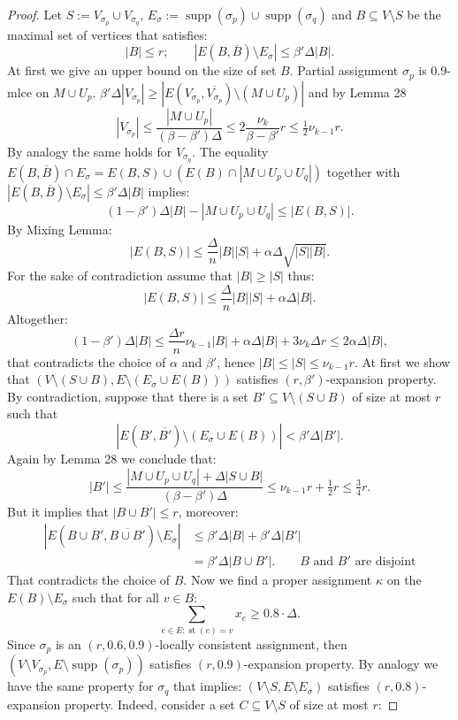 \documentclass[10pt,a4paper]{article}
\newcommand{\supp}{\operatorname{supp}}
\newcommand{\st}{\operatorname{st}}
\begin{document}
\begin{proof}
Let $S:=V_{\sigma_p}\cup V_{\sigma_q}$, $E_\sigma:=\supp(\sigma_p)\cup\supp(\sigma_q)$ and $B\subseteq V\setminus S$ be the maximal set of vertices that satisfies:
\[|B|\le r;\qquad |E(B,\overline B)\setminus E_\sigma|\le\beta'\Delta|B|.\]
At first we give an upper bound on the size of set $B$.
Partial assignment $\sigma_p$ is $0.9$-mlce on $M\cup U_p$. $\beta'\Delta|V_{\sigma_p}|\ge|E(V_{\sigma_p},\overline{V_{\sigma_p}})\setminus(M\cup U_p)|$ and by Lemma 28
\[|V_{\sigma_p}|\le\frac{|M\cup U_p|}{(\beta-\beta')\Delta}\le2\frac{\nu_k}{\beta-\beta'}r\le\tfrac12\nu_{k-1}r.\]
By analogy the same holds for $V_{\sigma_q}$.
The equality $E(B,\overline B)\cap E_\sigma=E(B,S)\cup(E(B)\cap|M\cup U_p\cup U_q|)$ together with $|E(B,\overline B)\setminus E_\sigma|\le\beta'\Delta|B|$ implies:
\[(1-\beta')\Delta|B|-|M\cup U_p\cup U_q|\le|E(B,S)|.\]
By Mixing Lemma:
\[|E(B,S)|\le\frac\Delta n|B||S|+\alpha\Delta\sqrt{|S||B|}.\]
For the sake of contradiction assume that $|B|\ge|S|$ thus:
\[|E(B,S)|\le\frac\Delta n|B||S|+\alpha\Delta|B|.\]
Altogether:
\[(1-\beta')\Delta|B|\le\frac{\Delta r}{n}\nu_{k-1}|B|+\alpha\Delta|B|+3\nu_k\Delta r\le2\alpha\Delta|B|,\]
that contradicts the choice of $\alpha$ and $\beta'$, hence $|B|\le|S|\le\nu_{k-1}r$.
At first we show that $(V\setminus(S\cup B),E\setminus(E_\sigma\cup E(B)))$ satisfies $(r,\beta')$-expansion property. By contradiction, suppose that there is a set $B'\subseteq V\setminus(S\cup B)$ of size at most $r$ such that
\[|E(B',\overline{B'})\setminus(E_\sigma\cup E(B))|<\beta'\Delta|B'|.\]
Again by Lemma 28 we conclude that:
\[|B'|\le\frac{|M\cup U_p\cup U_q|+\Delta|S\cup B|}{(\beta-\beta')\Delta}\le\nu_{k-1}r+\tfrac12r\le\tfrac34r.\]
But it implies that $|B\cup B'|\le r$, moreover:
\begin{align*}
|E(B\cup B',\overline{B\cup B'})\setminus E_\sigma|&\le\beta'\Delta|B|+\beta'\Delta|B'|\\
&=\beta'\Delta|B\cup B'|.\qquad\text{$B$ and $B'$ are disjoint}
\end{align*}
That contradicts the choice of $B$.
Now we find a proper assignment $\kappa$ on the $E(B)\setminus E_\sigma$ such that for all $v\in B$:
\[\sum_{e\in E:\st(e)=v}x_e\ge0.8\cdot\Delta.\]
Since $\sigma_p$ is an $(r,0.6,0.9)$-locally consistent assignment, then $(V\setminus V_{\sigma_p},E\setminus\supp(\sigma_p))$ satisfies $(r,0.9)$-expansion property. By analogy we have the same property for $\sigma_q$ that implies: $(V\setminus S,E\setminus E_\sigma)$ satisfies $(r,0.8)$-expansion property. Indeed, consider a set $C\subseteq V\setminus S$ of size at most $r$:

\end{proof}
\end{document}
